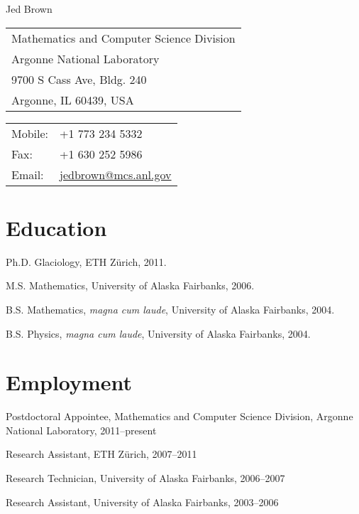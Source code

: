 \documentclass[10pt,letterpaper]{article}
\def\name{Jed Brown}
\renewenvironment{itemize}{
  \begin{list}{}{
    \setlength{\leftmargin}{1.5em}
    \setlength{\itemsep}{0.25em}
    \setlength{\parskip}{0pt}
    \setlength{\parsep}{0.25em}
  }
}{
  \end{list}
}
\begin{document}
{\LARGE \name}


\bigskip

\begin{minipage}[t]{0.5\textwidth}
  \begin{tabular}{l}
  Mathematics and Computer Science Division \\
  Argonne National Laboratory \\
  9700 S Cass Ave, Bldg. 240 \\
  Argonne, IL 60439, USA
\end{tabular}
\end{minipage}
\begin{minipage}[t]{0.5\textwidth}
  \begin{tabular}{ll}
    Mobile: & +1 773 234 5332 \\
    Fax: & +1 630 252 5986 \\
    Email: & \url{jedbrown@mcs.anl.gov}
  \end{tabular}
\end{minipage}

\section*{Education}

\begin{itemize}
\item Ph.D. Glaciology, ETH Z\"urich, 2011.
\item M.S. Mathematics, University of Alaska Fairbanks, 2006.
\item B.S. Mathematics, {\it magna cum laude}, University of Alaska Fairbanks, 2004.
\item B.S. Physics, {\it magna cum laude}, University of Alaska Fairbanks, 2004.
\end{itemize}

\section*{Employment}
\begin{itemize}
\item Postdoctoral Appointee, Mathematics and Computer Science Division, Argonne National Laboratory, 2011--present
\item Research Assistant, ETH Z\"urich, 2007--2011
\item Research Technician, University of Alaska Fairbanks, 2006--2007
\item Research Assistant, University of Alaska Fairbanks, 2003--2006
\end{itemize}
\end{document}
